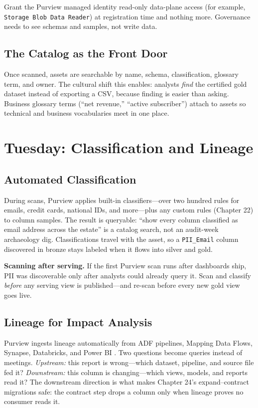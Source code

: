 \begin{tipbox}
Grant the Purview managed identity read-only data-plane access (for example, \texttt{Storage Blob Data Reader}) at registration time and nothing more. Governance needs to see schemas and samples, not write data.
\end{tipbox}

\subsection{The Catalog as the Front Door}
Once scanned, assets are searchable by name, schema, classification, glossary term, and owner. The cultural shift this enables: analysts \emph{find} the certified gold dataset instead of exporting a CSV, because finding is easier than asking. Business glossary terms (``net revenue,'' ``active subscriber'') attach to assets so technical and business vocabularies meet in one place.

\section{Tuesday: Classification and Lineage}

\subsection{Automated Classification}
During scans, Purview applies built-in classifiers---over two hundred rules for emails, credit cards, national IDs, and more---plus any custom rules (Chapter 22) to column samples. The result is queryable: ``show every column classified as email address across the estate'' is a catalog search, not an audit-week archaeology dig. Classifications travel with the asset, so a \texttt{PII\_Email} column discovered in bronze stays labeled when it flows into silver and gold.

\begin{pitfall}
\textbf{Scanning after serving.} If the first Purview scan runs after dashboards ship, PII was discoverable only after analysts could already query it. Scan and classify \emph{before} any serving view is published---and re-scan before every new gold view goes live.
\end{pitfall}

\subsection{Lineage for Impact Analysis}
Purview ingests lineage automatically from ADF pipelines, Mapping Data Flows, Synapse, Databricks, and Power BI \cite{microsoft2025purviewLineage}. Two questions become queries instead of meetings. \emph{Upstream:} this report is wrong---which dataset, pipeline, and source file fed it? \emph{Downstream:} this column is changing---which views, models, and reports read it? The downstream direction is what makes Chapter 24's expand--contract migrations safe: the contract step drops a column only when lineage proves no consumer reads it.

